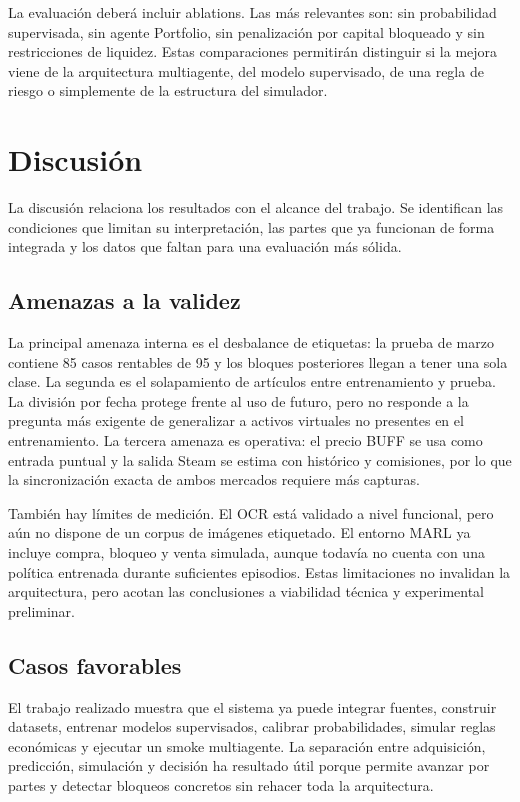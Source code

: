 La evaluación  deberá incluir ablations. Las más relevantes son: sin probabilidad supervisada, sin agente Portfolio, sin penalización por capital bloqueado y sin restricciones de liquidez. Estas comparaciones permitirán distinguir si la mejora viene de la arquitectura multiagente, del modelo supervisado, de una regla de riesgo o simplemente de la estructura del simulador.

\section{Discusión}

La discusión relaciona los resultados con el alcance del trabajo. Se identifican las condiciones que limitan su interpretación, las partes que ya funcionan de forma integrada y los datos que faltan para una evaluación más sólida.

\subsection{Amenazas a la validez}

La principal amenaza interna es el desbalance de etiquetas: la prueba de marzo contiene 85 casos rentables de 95 y los bloques posteriores llegan a tener una sola clase. La segunda es el solapamiento de artículos entre entrenamiento y prueba. La división por fecha protege frente al uso de futuro, pero no responde a la pregunta más exigente de generalizar a activos virtuales no presentes en el entrenamiento. La tercera amenaza es operativa: el precio BUFF se usa como entrada puntual y la salida Steam se estima con histórico y comisiones, por lo que la sincronización exacta de ambos mercados requiere más capturas.

También hay límites de medición. El OCR está validado a nivel funcional, pero aún no dispone de un corpus de imágenes etiquetado. El entorno MARL ya incluye compra, bloqueo y venta simulada, aunque todavía no cuenta con una política entrenada durante suficientes episodios. Estas limitaciones no invalidan la arquitectura, pero acotan las conclusiones a viabilidad técnica y experimental preliminar.

\subsection{Casos favorables}

El trabajo realizado muestra que el sistema ya puede integrar fuentes, construir datasets, entrenar modelos supervisados, calibrar probabilidades, simular reglas económicas y ejecutar un smoke multiagente. La separación entre adquisición, predicción, simulación y decisión ha resultado útil porque permite avanzar por partes y detectar bloqueos concretos sin rehacer toda la arquitectura.

